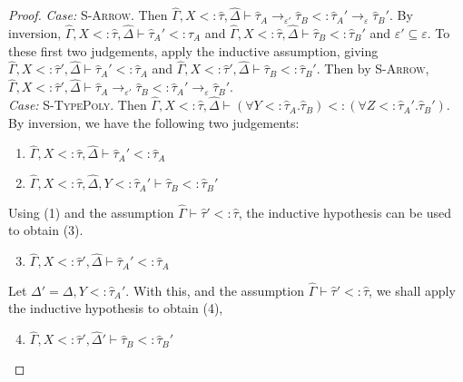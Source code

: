 \documentclass{llncs}
\begin{document}
\begin{proof}
\textit{Case:} \textsc{S-Arrow}. Then $\hat \Gamma, X <: \hat \tau, \hat \Delta \vdash \hat \tau_A \rightarrow_{\varepsilon'} \hat \tau_B <: \hat \tau_A' \rightarrow_{\varepsilon} \hat \tau_B'$. By inversion, $\hat \Gamma, X <: \hat \tau, \hat \Delta \vdash \hat \tau_A' <: \hat \tau_A$ and $\hat \Gamma, X <: \hat \tau, \hat \Delta \vdash \hat \tau_B <: \hat \tau_B'$ and $\varepsilon' \subseteq \varepsilon$. To these first two judgements, apply the inductive assumption, giving $\hat \Gamma, X <: \hat \tau', \hat \Delta \vdash \hat \tau_A' <: \hat \tau_A$ and $\hat \Gamma, X <: \hat \tau', \hat \Delta \vdash \hat \tau_B <: \hat \tau_B'$. Then by \textsc{S-Arrow}, $\hat \Gamma, X <: \hat \tau', \hat \Delta \vdash \hat \tau_A \rightarrow_{\varepsilon'} \hat \tau_B <: \hat \tau_A' \rightarrow_{\varepsilon} \hat \tau_B'$.\\

\textit{Case:} \textsc{S-TypePoly}. Then $\hat \Gamma, X <: \hat \tau, \hat \Delta \vdash (\forall Y <: \hat \tau_A. \hat \tau_B) <: (\forall Z <: \hat \tau_A'. \hat \tau_B')$. By inversion, we have the following two judgements:

\begin{enumerate}
	\item $\hat \Gamma, X <: \hat \tau, \hat \Delta \vdash \hat \tau_A' <: \hat \tau_A$
	\item $\hat \Gamma, X <: \hat \tau, \hat \Delta, Y <: \hat \tau_A' \vdash \hat \tau_B <: \hat \tau_B'$
\end{enumerate}

Using (1) and the assumption $\hat \Gamma \vdash \hat \tau' <: \hat \tau$, the inductive hypothesis can be used to obtain (3).

\begin{enumerate}

  \setcounter{enumi}{2}
	\item $\hat \Gamma, X <: \hat \tau', \hat \Delta \vdash \hat \tau_A' <: \hat \tau_A$

\end{enumerate}

Let $\Delta' = \Delta, Y <:  \hat \tau_A'$. With this, and the assumption $\hat \Gamma \vdash \hat \tau' <: \hat \tau$, we shall apply the inductive hypothesis to obtain (4),

\begin{enumerate}
	\setcounter{enumi}{3}
	\item $\hat \Gamma, X <: \hat \tau', \hat \Delta' \vdash \hat \tau_B <: \hat \tau_B'$ 
\end{enumerate}


\end{proof}
\end{document}
